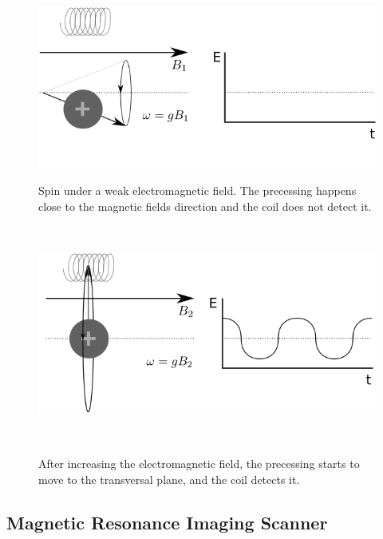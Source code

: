 \begin{figure}[h!]

\begin{minipage}[b]{0.49\textwidth}
    \includegraphics[width=\textwidth]{2.background/mri/img/spin0.png}
    \caption{Spin under a weak electromagnetic field. The precessing happens close to the magnetic fields direction and the coil does not detect it.}
    \label{fig:nosignal}
\end{minipage} ~ %
\hfill
\begin{minipage}[b]{0.49\textwidth}
    \includegraphics[width=\textwidth]{2.background/mri/img/spin1.png}
    \caption{After increasing the electromagnetic field, the precessing starts to move to the transversal plane, and the coil detects it.}
    \label{fig:signal}    
\end{minipage} ~ %

\end{figure}

\subsection{Magnetic Resonance Imaging Scanner}


